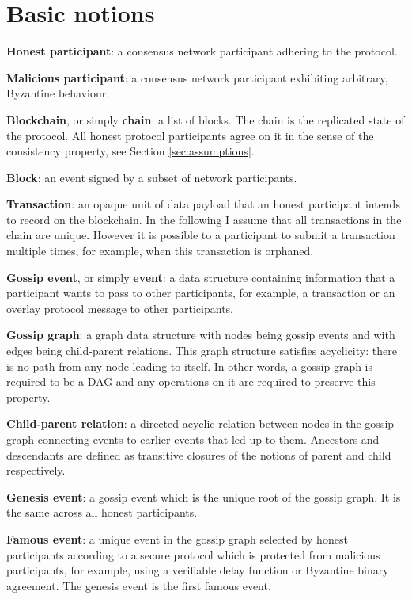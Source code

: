 \documentclass[a4paper,11pt]{article}
\begin{document}
\section{Basic notions}

\textbf{Honest participant}: a consensus network participant adhering to the protocol.

\noindent
\textbf{Malicious participant}: a consensus network participant exhibiting arbitrary, Byzantine
behaviour.

\noindent
\textbf{Blockchain}, or simply \textbf{chain}: a list of blocks. The chain is the replicated state
of the protocol. All honest protocol participants agree on it in the sense of the consistency
property, see Section \ref{sec:assumptions}.

\noindent
\textbf{Block}: an event signed by a subset of network participants.

\noindent
\textbf{Transaction}: an opaque unit of data payload that an honest participant intends to record on
the blockchain. In the following I assume that all transactions in the chain are unique. However it
is possible to a participant to submit a transaction multiple times, for example, when this
transaction is orphaned.

\noindent
\textbf{Gossip event}, or simply \textbf{event}: a data structure containing information that a
participant wants to pass to other participants, for example, a transaction or an overlay protocol
message to other participants.

\noindent
\textbf{Gossip graph}: a graph data structure with nodes being gossip events and with edges being
child-parent relations. This graph structure satisfies acyclicity: there is no path from any node
leading to itself. In other words, a gossip graph is required to be a DAG and any operations on it
are required to preserve this property.

\noindent
\textbf{Child-parent relation}: a directed acyclic relation between nodes in the gossip graph
connecting events to earlier events that led up to them. Ancestors and descendants are defined as
transitive closures of the notions of parent and child respectively.

\noindent
\textbf{Genesis event}: a gossip event which is the unique root of the gossip graph. It is the same
across all honest participants.

\noindent
\textbf{Famous event}: a unique event in the gossip graph selected by honest participants according
to a secure protocol which is protected from malicious participants, for example, using a verifiable
delay function or Byzantine binary agreement. The genesis event is the first famous event.
\end{document}
